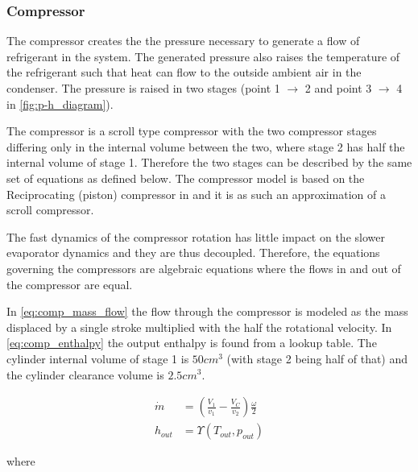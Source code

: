 \subsubsection{Compressor}
The compressor creates the the pressure necessary to generate a flow of refrigerant in the system. The generated pressure also raises the temperature of the refrigerant such that heat can flow to the outside ambient air in the condenser. The pressure is raised in two stages (point 1 $\rightarrow$ 2 and point 3 $\rightarrow$ 4 in \cref{fig:p-h_diagram}).

The compressor is a scroll type compressor with the two compressor stages differing only in the internal volume between the two, where stage 2 has half the internal volume of stage 1. Therefore the two stages can be described by the same set of equations as defined below. The compressor model is based on the Reciprocating (piston) compressor in \cite{Sorensen2013} and it is as such an approximation of a scroll compressor. 

The fast dynamics of the compressor rotation has little impact on the slower evaporator dynamics and they are thus decoupled. Therefore, the equations governing the compressors are algebraic equations where the flows in and out of the compressor are equal.

In \cref{eq:comp_mass_flow} the flow through the compressor is modeled as the mass displaced by a single stroke multiplied with the half the rotational velocity.
In \cref{eq:comp_enthalpy} the output enthalpy is found from a lookup table. The cylinder internal volume of stage 1 is $50cm^3$ (with stage 2 being half of that) and the cylinder clearance volume is $2.5cm^3$.

\begin{align}
	\dot{m} &= \left(\frac{V_1}{v_1} - \frac{V_C}{v_2}\right) \frac{\omega}{2} \label{eq:comp_mass_flow} \\
	h_{out} &= \Upsilon(T_{out}, p_{out}) \label{eq:comp_enthalpy}
\end{align}

where

